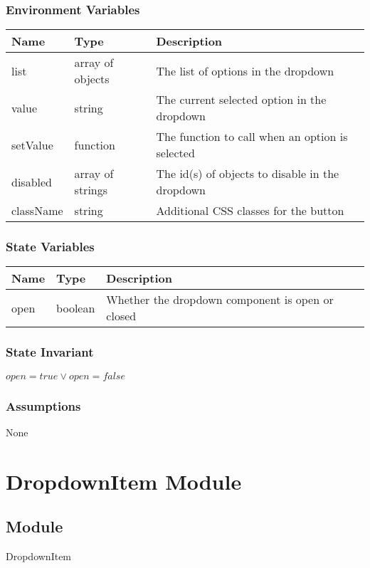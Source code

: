 \documentclass[12pt]{article}
\begin{document}
\subsubsection{Environment Variables}
\begin{tabular}{| l | l | p{10cm} |}
    \hline
    \textbf{Name} & \textbf{Type} & \textbf{Description}\\ \hline
    list & array of objects & The list of options in the dropdown\\ \hline
    value & string & The current selected option in the dropdown\\ \hline
    setValue & function & The function to call when an option is selected\\ \hline
    disabled & array of strings & The id(s) of objects to disable in the dropdown\\ \hline
    className & string & Additional CSS classes for the button\\ \hline
\end{tabular}

\subsubsection{State Variables}
\begin{tabular}{| l | l | p{10cm} |}
    \hline
    \textbf{Name} & \textbf{Type} & \textbf{Description}\\ \hline
    open & boolean & Whether the dropdown component is open or closed\\ \hline
\end{tabular}

\subsubsection{State Invariant}
$open = true \lor open = false$

\subsubsection{Assumptions}
None

\newpage


\section{DropdownItem Module}

\subsection{Module}
DropdownItem
\end{document}
